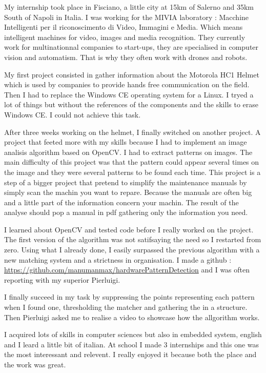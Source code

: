 \documentclass[english,a4paper,11pt]{report}
\begin{document}
	\listoffigures
		
	
	
	
	


	\par My internship took place in Fisciano, a little city at 15km of Salerno and 35km South of Napoli in Italia. I was working for the MIVIA laboratory : Macchine Intelligenti per il riconoscimento di Video, Immagini e Media. Which means intelligent machines for video, images and media recognition. They currently work for multinationnal companies to start-ups, they are specialised in computer vision and automatism. That is why they often work with drones and robots.
	\par My first project consisted in gather information about the Motorola HC1 Helmet which is used by companies to provide hands free communication on the field. Then I had to replace the Windows CE operating system for a Linux. I tryed a lot of things but without the references of the components and the skills to erase Windows CE. I could not achieve this task.
	\par After three weeks working on the helmet, I finally switched on another project. A project that feeted more with my skills because I had to implement an image analisis algorithm based on OpenCV. I had to extract patterns on images. The main difficulty of this project was that the pattern could appear several times on the image and they were several patterns to be found each time. This project is a step of a bigger project that pretend to simplify the maintenance manuals by simply scan the machin you want to repare. Because the manuals are often big and a little part of the information concern your machin. The result of the analyse should pop a manual in pdf gathering only the information you need.
	\par I learned about OpenCV and tested code before I really worked on the project. The first version of the algorithm was not satifsaying the need so I restarted from zero. Using what I already done, I easily surpassed the previous algorithm with a new matching system and a strictness in organisation. I made a github : \url{https://github.com/manumanmax/hardwarePatternDetection} and I was often reporting with my superior Pierluigi.
	\par I finally succeed in my task by suppressing the points representing each pattern when I found one, thresholding the matcher and gathering the in a structure. Then Pierluigi asked me to realise a video to showcase how the allgorithm works.
	
	\par I acquired lots of skills in computer sciences but also in embedded system, english and I leard a little bit of italian. At school I made 3 internships and this one was the most interessant and relevent. I really enjoyed it because both the place and the work was great.
	
	
	
\end{document}
